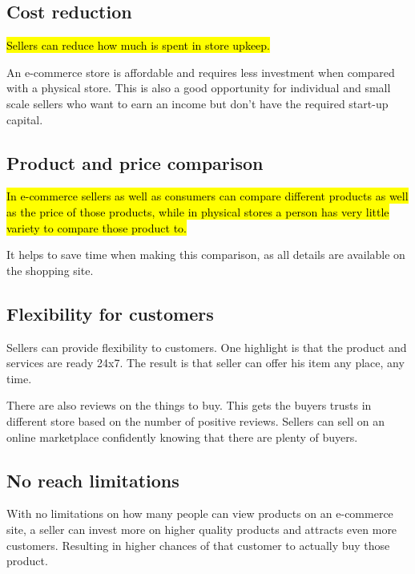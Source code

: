 \documentclass[12pt, a4paper]{article}
\begin{document}
\subsection{Cost reduction}
\hl{Sellers can reduce how much is spent in store upkeep.}

An e-commerce store is affordable and requires less investment when compared
with a physical store. This is also a good opportunity for individual and
small scale sellers who want to earn an income but don’t have the required
start-up capital.

\subsection{Product and price comparison}
\hl{In e-commerce sellers as well as consumers can compare different products
as well as the price of those products, while in physical stores a person has
very little variety to compare those product to.}

It helps to save time when making this comparison, as all details are
available on the shopping site.

\subsection{Flexibility for customers}
Sellers can provide flexibility to customers. One highlight is that the
product and services are ready 24x7. The result is that seller can offer his
item any place, any time.

There are also reviews on the things to buy. This gets the buyers trusts in
different store based on the number of positive reviews.
Sellers can sell on an online marketplace confidently knowing that there are
plenty of buyers.

\subsection{No reach limitations}
With no limitations on how many people can view products on an e-commerce
site, a seller can invest more on higher quality products and attracts even
more customers.
Resulting in higher chances of that customer to actually buy those product.
\end{document}
